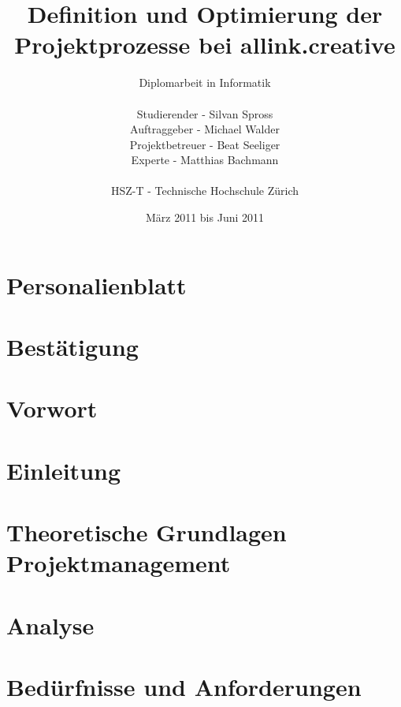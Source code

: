 \documentclass[
11pt, %
a4paper, %
BCOR10mm, %
DIV14, %
footsepline = false, %
headsepline, %
oneside, %
openright,
halfparskip, %
abstracton, %
listof=totocnumbered, %
bibliography=totocnumbered %
]{scrreprt}
\title{Definition und Optimierung der Projektprozesse bei allink.creative}
\author{Diplomarbeit in Informatik\\
    \\
    Studierender - Silvan Spross\\
	Auftraggeber - Michael Walder\\
    Projektbetreuer - Beat Seeliger\\
    Experte - Matthias Bachmann\\
	\\
	HSZ-T - Technische Hochschule Zürich}
\date{März 2011 bis Juni 2011}
\begin{document}
  \ifpdf
  \else
  \fi

  
  \maketitle

  

  
  \tableofcontents
  
  \chapter{Personalienblatt}
  
  
  \chapter{Bestätigung}
  
  
  \chapter{Vorwort}
  
  
  \chapter{Einleitung}
    
  
  \chapter{Theoretische Grundlagen Projektmanagement}\label{chap:theorie_teil}
  
  
  \chapter{Analyse}\label{chap:analyse}
  
  
  \chapter{Bedürfnisse und Anforderungen}\label{chap:anforderungen}
  
  
\end{document}
